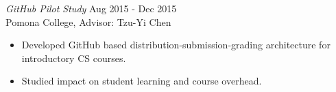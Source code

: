 {\sl GitHub Pilot Study} \hfill Aug 2015 - Dec 2015 \\
Pomona College, Advisor: Tzu-Yi Chen
\begin{itemize}\itemsep -2pt
  \item Developed GitHub based distribution-submission-grading architecture for
  introductory CS courses.
  \item Studied impact on student learning and course overhead.
\end{itemize}
